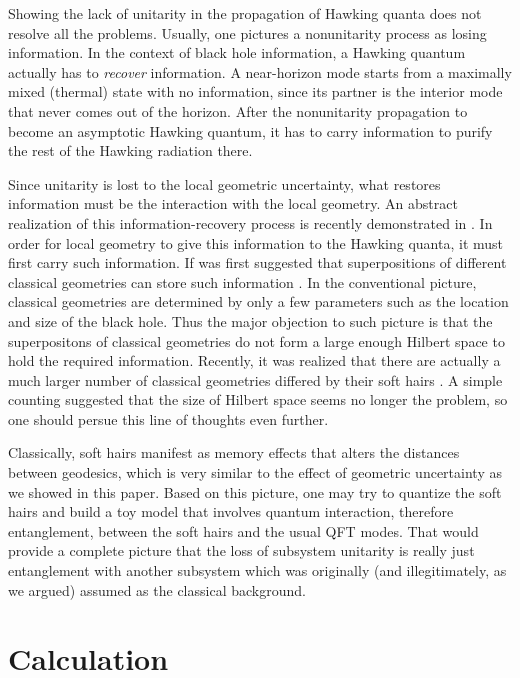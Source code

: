 \documentclass[aps,showpacs,twocolumn,floats,prd,superscriptaddress,nofootinbib]{revtex4-1}
\begin{document}
Showing the lack of unitarity in the propagation of Hawking quanta does not resolve all the problems. 
Usually, one pictures a nonunitarity process as losing information. 
In the context of black hole information, a Hawking quantum actually has to {\it recover} information. 
A near-horizon mode starts from a maximally mixed (thermal) state with no information, since its partner is the interior mode that never comes out of the horizon. 
After the nonunitarity propagation to become an asymptotic Hawking quantum, it has to carry information to purify the rest of the Hawking radiation there.

Since unitarity is lost to the local geometric uncertainty, what restores information must be the interaction with the local geometry. 
An abstract realization of this information-recovery process is recently demonstrated in \cite{OsuPag16}. 
In order for local geometry to give this information to the Hawking quanta, it must first carry such information.
If was first suggested that superpositions of different classical geometries can store such information \cite{NomVar12}.
In the conventional picture, classical geometries are determined by only a few parameters such as the location and size of the black hole.
Thus the major objection to such picture is that the superpositons of classical geometries do not form a large enough Hilbert space to hold the required information.
Recently, it was realized that there are actually a much larger number of classical geometries differed by their soft hairs \cite{HawPer16}.
A simple counting suggested that the size of Hilbert space seems no longer the problem, so one should persue this line of thoughts even further.

Classically, soft hairs manifest as memory effects that alters the distances between geodesics, which is very similar to the effect of geometric uncertainty as we showed in this paper.
Based on this picture, one may try to quantize the soft hairs and build a toy model that involves quantum interaction, therefore entanglement, between the soft hairs and the usual QFT modes.
That would provide a complete picture that the loss of subsystem unitarity is really just entanglement with another subsystem which was originally (and illegitimately, as we argued) assumed as the classical background.


\appendix


\section{Calculation}
\end{document}
